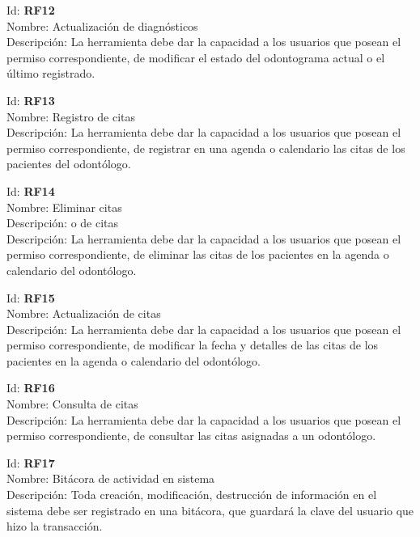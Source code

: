 \vspace{1em}

\noindent Id:  \textbf{RF12}\\
Nombre: Actualización de diagnósticos\\
Descripción: La herramienta debe dar la capacidad a los usuarios que posean el permiso correspondiente, de modificar el estado del odontograma actual o el último registrado.

\vspace{1em}

\noindent Id:  \textbf{RF13}\\
Nombre: Registro de citas\\
Descripción: La herramienta debe dar la capacidad a los usuarios que posean el permiso correspondiente, de registrar en una agenda o calendario las citas de los pacientes del odontólogo.

\vspace{1em}

\noindent Id:  \textbf{RF14}\\
Nombre: Eliminar citas\\
Descripción: o de citas\\
Descripción: La herramienta debe dar la capacidad a los usuarios que posean el permiso correspondiente, de eliminar las citas de los pacientes en la agenda o calendario del odontólogo.

\vspace{1em}

\noindent Id:  \textbf{RF15}\\
Nombre: Actualización de citas\\
Descripción: La herramienta debe dar la capacidad a los usuarios que posean el permiso correspondiente, de modificar la fecha y detalles de las citas de los pacientes en la agenda o calendario del odontólogo.


\noindent Id:  \textbf{RF16}\\
Nombre: Consulta de citas\\
Descripción: La herramienta debe dar la capacidad a los usuarios que posean el permiso correspondiente, de consultar las citas asignadas a un odontólogo.

\vspace{1em}

\noindent Id: \textbf{RF17}\\
Nombre: Bitácora de actividad en sistema\\
Descripción: Toda creación, modificación, destrucción de información en el sistema debe ser registrado en una bitácora, que guardará la clave del usuario que hizo la transacción.

